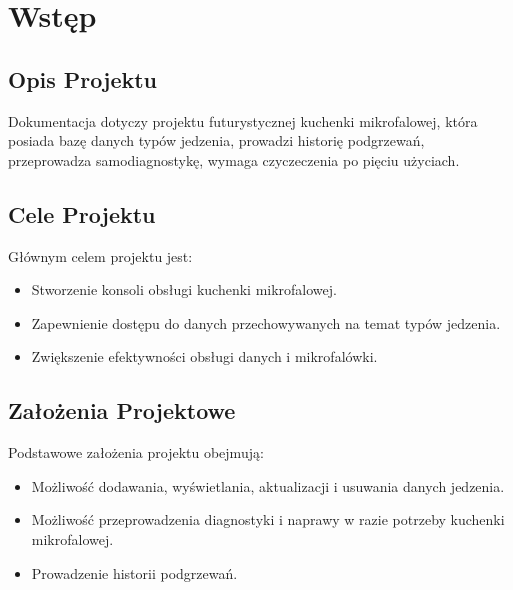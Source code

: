 ﻿\chapter*{Wstęp}

\section*{Opis Projektu}
Dokumentacja dotyczy projektu futurystycznej kuchenki mikrofalowej, która posiada bazę danych typów jedzenia, prowadzi historię podgrzewań, przeprowadza samodiagnostykę, wymaga czyczeczenia po pięciu użyciach.

\section*{Cele Projektu}
Głównym celem projektu jest:
\begin{itemize}
    \item Stworzenie konsoli obsługi kuchenki mikrofalowej.
    \item Zapewnienie dostępu do danych przechowywanych na temat typów jedzenia.
    \item Zwiększenie efektywności obsługi danych i mikrofalówki.
\end{itemize}

\section*{Założenia Projektowe}
Podstawowe założenia projektu obejmują:
\begin{itemize}
    \item Możliwość dodawania, wyświetlania, aktualizacji i usuwania danych jedzenia.
    \item Możliwość przeprowadzenia diagnostyki i naprawy w razie potrzeby kuchenki mikrofalowej.
    \item Prowadzenie historii podgrzewań.
\end{itemize}

